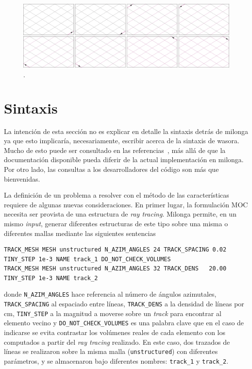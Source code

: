 \documentclass[11pt]{article}
\numberwithin{equation}{section}
\begin{document}
\begin{figure}[!h]
 \begin{center}
  \includegraphics[width=1.0\linewidth]{graficos/solver/cyclic-tracks-1.pdf}
 \end{center}
\caption{\label{fig:tracks-solver} .}
\end{figure}


\section{Sintaxis}

La intenci\'on de esta secci\'on no es explicar en detalle la sintaxis detr\'as de milonga ya que esto implicar\'ia, necesariamente, escribir acerca de la sintaxis de wasora. Mucho de esto puede ser consultado en las referencias~\cite{wasora, milongabase2010, milonga-db, enief-milonga-2014}, m\'as all\'a de que la documentaci\'on disponible pueda diferir de la actual implementación en milonga. Por otro lado, las consultas a los desarrolladores del c\'odigo son m\'as que bienvenidas. 

La definici\'on de un problema a resolver con el m\'etodo de las características requiere de algunas nuevas consideraciones. En primer lugar, la formulación MOC necesita ser provista de una estructura de \emph{ray tracing}. Milonga permite, en un mismo \emph{input}, generar diferentes estructuras de este tipo sobre una misma o diferentes mallas mediante las siguientes sentencias

\begin{lstlisting}[style=wasora]
TRACK_MESH MESH unstructured N_AZIM_ANGLES 24 TRACK_SPACING 0.02 TINY_STEP 1e-3 NAME track_1 DO_NOT_CHECK_VOLUMES
TRACK_MESH MESH unstructured N_AZIM_ANGLES 32 TRACK_DENS   20.00 TINY_STEP 1e-3 NAME track_2
\end{lstlisting}

\noindent
donde \texttt{N_AZIM_ANGLES} hace referencia al n\'umero de \'angulos azimutales, \texttt{TRACK_SPACING} al espaciado entre l\'ineas, \texttt{TRACK_DENS} a la densidad de l\'ineas por \si{\centi\metre}, \texttt{TINY_STEP} a la magnitud a moverse sobre un \emph{track} para encontrar al elemento vecino y \texttt{DO_NOT_CHECK_VOLUMES} es una palabra clave que en el caso de indicarse se evita contrastar los volúmenes reales de cada elemento con los computados a partir del \emph{ray tracing} realizado. En este caso, dos trazados de l\'ineas se realizaron sobre la misma malla (\texttt{unstructured}) con diferentes par\'ametros, y se almacenaron bajo diferentes nombres: \texttt{track_1} y \texttt{track_2}.
\end{document}
